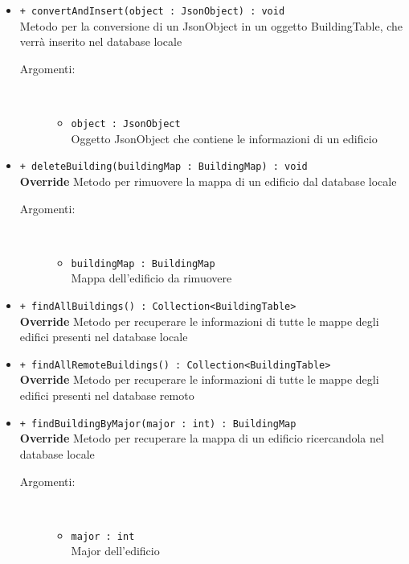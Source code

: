 \documentclass[../DefinizioneDiProdotto.tex]{subfiles}
\begin{document}
\begin{description}
\begin{itemize}
		\item \texttt{+ convertAndInsert(object : JsonObject) : void}\\
		Metodo per la conversione di un JsonObject in un oggetto BuildingTable, che verrà inserito nel database locale
		\begin{description}
			\item[Argomenti:] \
			\begin{itemize}
				\item \texttt{object : JsonObject}\\
				Oggetto JsonObject che contiene le informazioni di un edificio\end{itemize}
		\end{description}
		\item \texttt{+ deleteBuilding(buildingMap : BuildingMap) : void}\\
		\textbf{Override} Metodo per rimuovere la mappa di un edificio dal database locale
		\begin{description}
			\item[Argomenti:] \
			\begin{itemize}
				\item \texttt{buildingMap : BuildingMap}\\
				Mappa dell'edificio da rimuovere\end{itemize}
		\end{description}
		\item \texttt{+ findAllBuildings() : Collection<BuildingTable>}\\
		\textbf{Override} Metodo per recuperare le informazioni di tutte le mappe degli edifici presenti nel database locale
		\item \texttt{+ findAllRemoteBuildings() : Collection<BuildingTable>}\\
		\textbf{Override} Metodo per recuperare le informazioni di tutte le mappe degli edifici presenti nel database remoto
		\item \texttt{+ findBuildingByMajor(major : int) : BuildingMap}\\
		\textbf{Override} Metodo per recuperare la mappa di un edificio ricercandola nel database locale
		\begin{description}
			\item[Argomenti:] \
			\begin{itemize}
				\item \texttt{major : int}\\
				Major dell'edificio\end{itemize}

\end{description}
\end{itemize}
\end{description}
\end{document}
